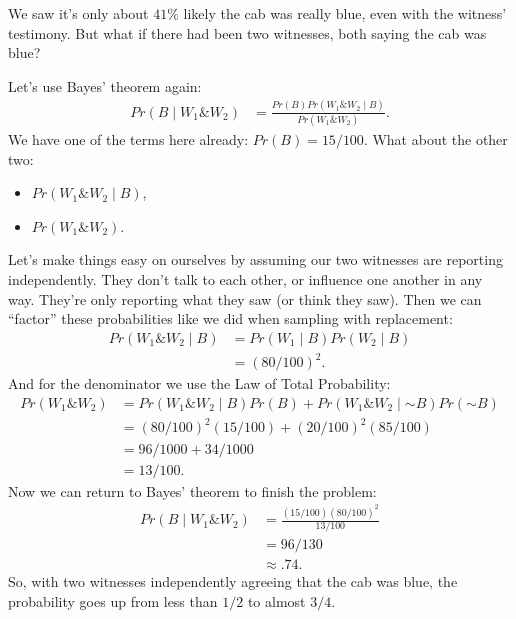 \documentclass[justified]{tufte-book}
\providecommand{\tightlist}{%
  \setlength{\itemsep}{0pt}\setlength{\parskip}{0pt}}
\newcommand{\given}{\mid}
\renewcommand{\neg}{\mathbin{\sim}}
\renewcommand{\wedge}{\mathbin{\&}}
\newcommand{\p}{Pr}
\theoremstyle{definition}
\theoremstyle{definition}
\theoremstyle{definition}
\theoremstyle{definition}
\theoremstyle{remark}
\begin{document}
We saw it's only about \(41\%\) likely the cab was really blue, even with the witness' testimony. But what if there had been two witnesses, both saying the cab was blue?

Let's use Bayes' theorem again:
\[
  \begin{aligned}
    \p(B \given W_1 \wedge W_2) &= \frac{\p(B)\p(W_1 \wedge W_2 \given B)}{\p(W_1 \wedge W_2)}.
  \end{aligned}
\]
We have one of the terms here already: \(\p(B) = 15/100\). What about the other two:

\begin{itemize}
\tightlist
\item
  \(\p(W_1 \wedge W_2 \given B)\),
\item
  \(\p(W_1 \wedge W_2)\).
\end{itemize}

Let's make things easy on ourselves by assuming our two witnesses are reporting independently. They don't talk to each other, or influence one another in any way. They're only reporting what they saw (or think they saw). Then we can ``factor'' these probabilities like we did when sampling with replacement:
\[
  \begin{aligned}
    \p(W_1 \wedge W_2 \given B) &= \p(W_1 \given B) \p(W_2 \given B)\\
                                &= (80/100)^2.
  \end{aligned}
\]
And for the denominator we use the Law of Total Probability:
\[
  \begin{aligned}
    \p(W_1 \wedge W_2) &= \p(W_1 \wedge W_2 \given B)\p(B) + 
                          \p(W_1 \wedge W_2 \given \neg B)\p(\neg B)\\
                       &= (80/100)^2(15/100) + (20/100)^2(85/100)\\
                       &= 96/1000 + 34/1000\\
                       &= 13/100.
  \end{aligned}
\]
Now we can return to Bayes' theorem to finish the problem:
\[
  \begin{aligned}
    \p(B \given W_1 \wedge W_2) &= \frac{(15/100)(80/100)^2}{13/100}\\
                                &= 96/130\\
                                &\approx .74.
  \end{aligned}
\]
So, with two witnesses independently agreeing that the cab was blue, the probability goes up from less than \(1/2\) to almost \(3/4\).
\end{document}
